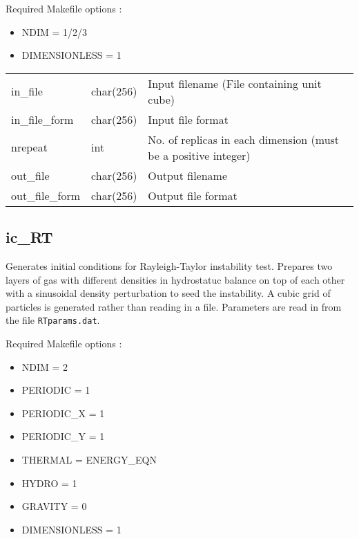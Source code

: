 \documentclass[a4paper]{article}
\newcommand{\var}[1]{\texttt{#1}}
\begin{document}
\noindent Required Makefile options :
\begin{itemize}
\item NDIM = 1/2/3
\item DIMENSIONLESS = 1
\end{itemize}

\vspace{0.1cm}

\begin{center}
\begin{supertabular}{|p{3cm}|p{2cm}|p{8cm}|}
in\_file         & char(256) & Input filename (File containing unit cube) \\
in\_file\_form   & char(256) & Input file format \\
nrepeat          & int       & No. of replicas in each dimension 
                               (must be a positive integer) \\
out\_file        & char(256) & Output filename \\
out\_file\_form  & char(256) & Output file format \\
\end{supertabular}
\end{center}

\newpage


\subsection{ic\_RT}
Generates initial conditions for Rayleigh-Taylor instability test.  Prepares two layers of gas with different densities in hydrostatuc balance on top of each other with a sinusoidal density perturbation to seed the instability.  A cubic grid of particles is generated rather than reading in a file.  Parameters are read in from the file \var{RTparams.dat}. \newline

\noindent Required Makefile options :
\begin{itemize}
\item NDIM = 2
\item PERIODIC = 1
\item PERIODIC\_X = 1
\item PERIODIC\_Y = 1
\item THERMAL = ENERGY\_EQN
\item HYDRO = 1
\item GRAVITY = 0
\item DIMENSIONLESS = 1
\end{itemize}
\end{document}
